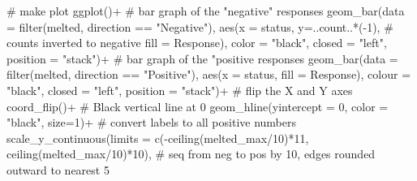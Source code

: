 \documentclass[
]{article}
\newenvironment{Shaded}{\begin{snugshade}}{\end{snugshade}}
\newcommand{\CommentTok}[1]{\textcolor[rgb]{0.50,0.62,0.50}{#1}}
\newcommand{\DataTypeTok}[1]{\textcolor[rgb]{0.87,0.87,0.75}{#1}}
\newcommand{\DecValTok}[1]{\textcolor[rgb]{0.86,0.86,0.80}{#1}}
\newcommand{\KeywordTok}[1]{\textcolor[rgb]{0.94,0.87,0.69}{#1}}
\newcommand{\NormalTok}[1]{\textcolor[rgb]{0.80,0.80,0.80}{#1}}
\newcommand{\OperatorTok}[1]{\textcolor[rgb]{0.94,0.94,0.82}{#1}}
\newcommand{\StringTok}[1]{\textcolor[rgb]{0.80,0.58,0.58}{#1}}
\begin{document}
\begin{Shaded}
\begin{Highlighting}[]
\CommentTok{\# make plot}
\KeywordTok{ggplot}\NormalTok{()}\OperatorTok{+}
\StringTok{     }\CommentTok{\# bar graph of the "negative" responses }
\StringTok{     }\KeywordTok{geom\_bar}\NormalTok{(}\DataTypeTok{data =} \KeywordTok{filter}\NormalTok{(melted,}
\NormalTok{                            direction }\OperatorTok{==}\StringTok{ "Negative"}\NormalTok{), }
              \KeywordTok{aes}\NormalTok{(}\DataTypeTok{x =}\NormalTok{ status,}
                        \DataTypeTok{y=}\NormalTok{..count..}\OperatorTok{*}\NormalTok{(}\OperatorTok{{-}}\DecValTok{1}\NormalTok{),    }\CommentTok{\# counts inverted to negative}
                        \DataTypeTok{fill =}\NormalTok{ Response),}
                    \DataTypeTok{color =} \StringTok{"black"}\NormalTok{,}
                    \DataTypeTok{closed =} \StringTok{"left"}\NormalTok{, }
                    \DataTypeTok{position =} \StringTok{"stack"}\NormalTok{)}\OperatorTok{+}
\StringTok{     }
\StringTok{     }\CommentTok{\# bar graph of the "positive responses}
\StringTok{     }\KeywordTok{geom\_bar}\NormalTok{(}\DataTypeTok{data =} \KeywordTok{filter}\NormalTok{(melted, direction }\OperatorTok{==}\StringTok{ "Positive"}\NormalTok{),}
              \KeywordTok{aes}\NormalTok{(}\DataTypeTok{x =}\NormalTok{ status, }\DataTypeTok{fill =}\NormalTok{ Response),}
              \DataTypeTok{colour =} \StringTok{"black"}\NormalTok{,}
              \DataTypeTok{closed =} \StringTok{"left"}\NormalTok{,}
              \DataTypeTok{position =} \StringTok{"stack"}\NormalTok{)}\OperatorTok{+}
\StringTok{     }
\StringTok{     }\CommentTok{\# flip the X and Y axes}
\StringTok{     }\KeywordTok{coord\_flip}\NormalTok{()}\OperatorTok{+}
\StringTok{  }
\StringTok{     }\CommentTok{\# Black vertical line at 0}
\StringTok{     }\KeywordTok{geom\_hline}\NormalTok{(}\DataTypeTok{yintercept =} \DecValTok{0}\NormalTok{, }\DataTypeTok{color =} \StringTok{"black"}\NormalTok{, }\DataTypeTok{size=}\DecValTok{1}\NormalTok{)}\OperatorTok{+}
\StringTok{     }
\StringTok{    }\CommentTok{\# convert labels to all positive numbers}
\StringTok{    }\KeywordTok{scale\_y\_continuous}\NormalTok{(}\DataTypeTok{limits =} \KeywordTok{c}\NormalTok{(}\OperatorTok{{-}}\KeywordTok{ceiling}\NormalTok{(melted\_max}\OperatorTok{/}\DecValTok{10}\NormalTok{)}\OperatorTok{*}\DecValTok{11}\NormalTok{, }\KeywordTok{ceiling}\NormalTok{(melted\_max}\OperatorTok{/}\DecValTok{10}\NormalTok{)}\OperatorTok{*}\DecValTok{10}\NormalTok{),   }\CommentTok{\# seq from neg to pos by 10, edges rounded outward to nearest 5}

\end{Highlighting}
\end{Shaded}
\end{document}
